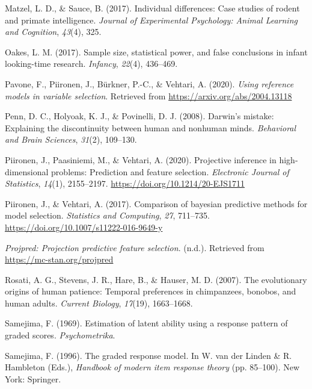 \documentclass[
  man,floatsintext]{apa6}
\newlength{\cslhangindent}
\newlength{\cslentryspacingunit} %
\newenvironment{CSLReferences}[2] %
 {%
  \setlength{\parindent}{0pt}
  \ifodd #1
  \let\oldpar\par
  \def\par{\hangindent=\cslhangindent\oldpar}
  \fi
  \setlength{\parskip}{#2\cslentryspacingunit}
 }%
 {}
\begin{document}
\begin{CSLReferences}{1}{0}
\leavevmode{}%
Matzel, L. D., \& Sauce, B. (2017). Individual differences: Case studies of rodent and primate intelligence. \emph{Journal of Experimental Psychology: Animal Learning and Cognition}, \emph{43}(4), 325.

\leavevmode{}%
Oakes, L. M. (2017). Sample size, statistical power, and false conclusions in infant looking-time research. \emph{Infancy}, \emph{22}(4), 436--469.

\leavevmode{}%
Pavone, F., Piironen, J., Bürkner, P.-C., \& Vehtari, A. (2020). \emph{Using reference models in variable selection}. Retrieved from \url{https://arxiv.org/abs/2004.13118}

\leavevmode{}%
Penn, D. C., Holyoak, K. J., \& Povinelli, D. J. (2008). Darwin's mistake: Explaining the discontinuity between human and nonhuman minds. \emph{Behavioral and Brain Sciences}, \emph{31}(2), 109--130.

\leavevmode{}%
Piironen, J., Paasiniemi, M., \& Vehtari, A. (2020). {Projective inference in high-dimensional problems: Prediction and feature selection}. \emph{Electronic Journal of Statistics}, \emph{14}(1), 2155--2197. \url{https://doi.org/10.1214/20-EJS1711}

\leavevmode{}%
Piironen, J., \& Vehtari, A. (2017). Comparison of bayesian predictive methods for model selection. \emph{Statistics and Computing}, \emph{27}, 711--735. \url{https://doi.org/10.1007/s11222-016-9649-y}

\leavevmode{}%
\emph{Projpred: Projection predictive feature selection}. (n.d.). Retrieved from \url{https://mc-stan.org/projpred}

\leavevmode{}%
Rosati, A. G., Stevens, J. R., Hare, B., \& Hauser, M. D. (2007). The evolutionary origins of human patience: Temporal preferences in chimpanzees, bonobos, and human adults. \emph{Current Biology}, \emph{17}(19), 1663--1668.

\leavevmode{}%
Samejima, F. (1969). Estimation of latent ability using a response pattern of graded scores. \emph{Psychometrika}.

\leavevmode{}%
Samejima, F. (1996). The graded response model. In W. van der Linden \& R. Hambleton (Eds.), \emph{Handbook of modern item response theory} (pp. 85--100). New York: Springer.


\end{CSLReferences}
\end{document}
